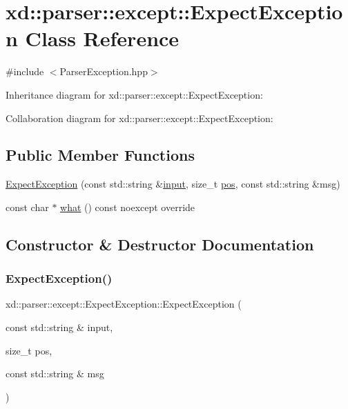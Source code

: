 \hypertarget{classxd_1_1parser_1_1except_1_1_expect_exception}{}\section{xd\+:\+:parser\+:\+:except\+:\+:Expect\+Exception Class Reference}
\label{classxd_1_1parser_1_1except_1_1_expect_exception}


{\ttfamily \#include $<$Parser\+Exception.\+hpp$>$}



Inheritance diagram for xd\+:\+:parser\+:\+:except\+:\+:Expect\+Exception\+:


Collaboration diagram for xd\+:\+:parser\+:\+:except\+:\+:Expect\+Exception\+:
\subsection*{Public Member Functions}
\begin{DoxyCompactItemize}
\item 
\mbox{\hyperlink{classxd_1_1parser_1_1except_1_1_expect_exception_af9348b4030c01ed6877c53dbae6565ea}{Expect\+Exception}} (const std\+::string \&\mbox{\hyperlink{classxd_1_1parser_1_1except_1_1_parser_exception_a6fde0ecef06df6bc2bcaef504269acea}{input}}, size\+\_\+t \mbox{\hyperlink{classxd_1_1parser_1_1except_1_1_parser_exception_ab58b07ce51aef576df0cfe45f0c7e222}{pos}}, const std\+::string \&msg)
\item 
const char $\ast$ \mbox{\hyperlink{classxd_1_1parser_1_1except_1_1_expect_exception_a0aa811fd2ae98e0611bf7535c01864ec}{what}} () const noexcept override
\end{DoxyCompactItemize}


\subsection{Constructor \& Destructor Documentation}
\mbox{\label{classxd_1_1parser_1_1except_1_1_expect_exception_af9348b4030c01ed6877c53dbae6565ea}} 
\subsubsection{\texorpdfstring{Expect\+Exception()}{ExpectException()}}
{\footnotesize\ttfamily xd\+::parser\+::except\+::\+Expect\+Exception\+::\+Expect\+Exception (\begin{DoxyParamCaption}\item[{const std\+::string \&}]{input,  }\item[{size\+\_\+t}]{pos,  }\item[{const std\+::string \&}]{msg }\end{DoxyParamCaption})\hspace{0.3cm}{\ttfamily [inline]}}



